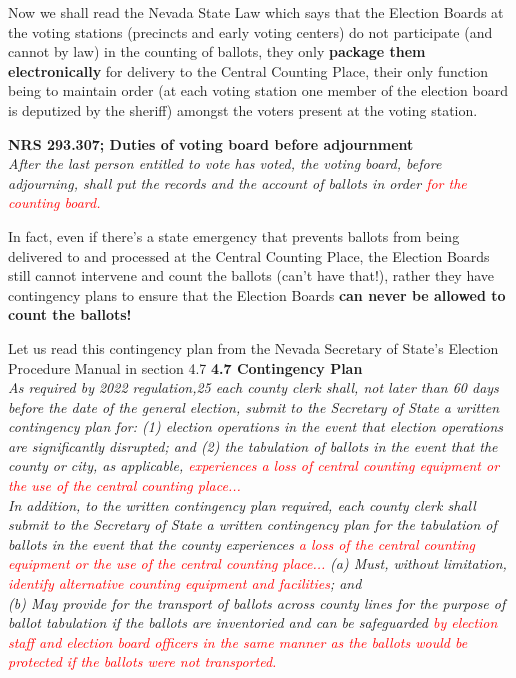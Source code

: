 Now we shall read the Nevada State Law which says that the Election Boards at the voting stations (precincts and early voting centers) do not participate (and cannot by law) in the counting of ballots, they only 
\textbf{package them electronically} for delivery to the Central Counting Place, their only function being to maintain order (at each voting station one member of the election board is deputized by the sheriff) amongst the voters present at the voting station.

\textbf{NRS 293.307; Duties of voting board before adjournment}\\
\textit{After the last person entitled to vote has voted, the voting board, before adjourning, shall put the records and the account of ballots in order \textcolor{red}{for the counting board.}}

In fact, even if there's a state emergency that prevents ballots from being delivered to and processed at the Central Counting Place, the Election Boards still cannot intervene and count the ballots (can't have that!), rather they have contingency plans to ensure that the Election Boards \textbf{can never be allowed to count the ballots!}

Let us read this contingency plan from the Nevada Secretary of State's Election Procedure Manual in section 4.7
\newpage
\textbf{4.7 Contingency Plan}\\
\textit{As required by 2022 regulation,25 each county clerk shall, not later than 60 days before the date of the general
election, submit to the Secretary of State a written contingency plan for: (1) election operations in the event
that election operations are significantly disrupted; and (2) the tabulation of ballots in the event that the
county or city, as applicable, \textcolor{red}{experiences a loss of central counting equipment or the use of the central
counting place...} }\\
\textit{In addition, to the written contingency plan required, each county clerk shall submit to the Secretary of State a written contingency plan for the tabulation of ballots in the event that the county experiences \textcolor{red}{a loss of the central counting equipment or the use of the central counting place...}}
\textit{(a) Must, without limitation, \textcolor{red}{identify alternative counting equipment and facilities}; and\\
(b) May provide for the transport of ballots across county lines for the purpose of ballot tabulation if the
ballots are inventoried and can be safeguarded \textcolor{red}{by election staff and election board officers in the same manner as the ballots would be protected if the ballots were not transported.}}

